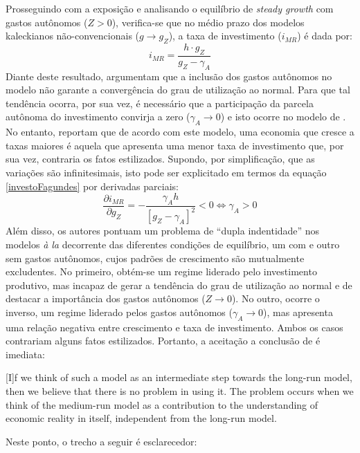 Prosseguindo com a exposição e analisando o equilíbrio de \textit{steady growth} com gastos autônomos ($Z > 0$), verifica-se que no médio prazo dos modelos kaleckianos não-convencionais ($g\to g_Z$), a taxa de investimento ($i_{MR}$) é dada por:
\begin{equation}
\label{investoFagundes}
i_{MR} = \frac{h\cdot g_Z}{g_Z - \gamma_A}
\end{equation}
Diante deste resultado, \textcite{fagundes_role_2017} argumentam que a inclusão dos gastos autônomos no modelo não garante a convergência do grau de utilização ao normal. Para que tal tendência ocorra, por sua vez, é necessário que a participação da parcela autônoma do investimento convirja a zero ($\gamma_A \to 0$) e isto ocorre no modelo de \textcite{allain_tackling_2015}. 
No entanto, \textcite{fagundes_role_2017} reportam que de acordo com este modelo, uma economia que cresce a taxas maiores é aquela que apresenta uma menor taxa de investimento que, por sua vez, contraria os fatos estilizados. Supondo, por simplificação, que as variações são infinitesimais, isto pode ser explicitado em termos da equação \ref{investoFagundes} por derivadas parciais:
$$
\frac{\partial i_{MR}}{\partial g_Z} = - \frac{\gamma_A h}{[g_Z - \gamma_A]^2} < 0 \Leftrightarrow \gamma_A > 0
$$
Além disso, os autores pontuam um problema de ``dupla indentidade'' nos modelos \textit{à la} \textcite{allain_tackling_2015} decorrente das diferentes condições de equilíbrio, um com e outro sem gastos autônomos, cujos padrões de crescimento são mutualmente excludentes. No primeiro, obtém-se um regime liderado pelo investimento produtivo, mas incapaz de gerar a tendência do grau de utilização ao normal e de destacar a importância dos gastos autônomos ($Z\to 0$). No outro, ocorre o inverso, um regime liderado pelos gastos autônomos ($\gamma_A \to 0$), mas apresenta uma relação negativa entre crescimento e taxa de investimento. Ambos os casos contrariam alguns fatos estilizados. Portanto, a aceitação a conclusão de \textcite[p.~13]{fagundes_role_2017} é imediata:

\begin{citacao}
	
	[I]f we think of such a model as an intermediate step towards the long-run model, then we
	believe that there is no problem in using it. The problem occurs when we think of the medium-run
	model as a contribution to the understanding of economic reality in itself, independent from the long-run model.
\end{citacao}
Neste ponto, o trecho a seguir é esclarecedor:

